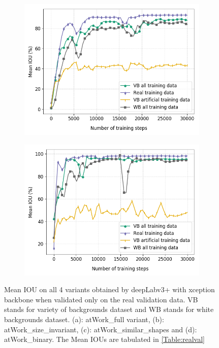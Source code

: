 \begin{figure}
\begin{subfigure}{.5\textwidth}
			\includegraphics[width=1\linewidth]{images/re_val_xcep_shape}
			\caption{}
		\end{subfigure}
		\begin{subfigure}{.5\textwidth}
			\centering
			\includegraphics[width=1\linewidth]{images/re_val_xcep_binary}
			\caption{}
		\end{subfigure}
		\caption{Mean IOU on all 4 variants obtained by deepLabv3+ with xception backbone when validated only on the real validation data. VB stands for variety of backgrounds dataset and WB stands for white backgrounds dataset. (a): atWork\_full variant, (b): atWork\_size\_invariant, (c): atWork\_similar\_shapes and (d): atWork\_binary. The Mean IOUs are tabulated in \ref{Table:realval}}
		\label{Fig:realvalxcep}
	\end{figure}

